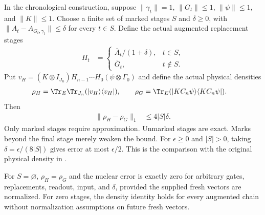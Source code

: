 \begin{theorem}
    \label{thm:construction_original_density_error}
    \leanok
    In the chronological construction, suppose
    $\lVert\gamma_t\rVert=1$, $\lVert G_t\rVert\leq1$,
    $\lVert\psi\rVert\leq1$, and $\lVert K\rVert\leq1$.
    Choose a finite set of marked stages $S$ and $\delta\geq0$, with
    $\lVert A_t-A_{G_t,\gamma_t}\rVert\leq\delta$ for every $t\in S$.
    Define the actual augmented replacement stages
    \begin{align}
        H_t & =\begin{cases}
                   \overline A_t/(1+\delta), & t\in S,    \\
                   \overline G_t,            & t\notin S.
               \end{cases}
        \label{eq:construction_marked_inventory_gates}
    \end{align}
    Put $v_H=(K\otimes I_{J_n})H_{n-1}\cdots H_0
        (\psi\otimes\Gamma_0)$ and define the actual physical densities
    \begin{align}
        \rho_H & =\Tr_E\Tr_{J_n}(|v_H\rangle\langle v_H|),
        \qquad
        \rho_G=\Tr_E(|KC_n\psi\rangle\langle KC_n\psi|).
        \label{eq:construction_original_comparison}
    \end{align}
    Then
    \begin{align}
        \lVert\rho_H-\rho_G\rVert_1 & \leq4|S|\delta.
        \label{eq:construction_original_error}
    \end{align}
    Only marked stages require approximation. Unmarked stages are exact.
    Marks beyond the final stage merely weaken the bound.
    For $\epsilon\geq0$ and $|S|>0$, taking
    $\delta=\epsilon/(8|S|)$ gives error at most $\epsilon/2$.
    This is the comparison with the original physical density in
    \cite[Equation~(5.3)]{OpenAI2026PolynomialPEPS}.

    For $S=\varnothing$, $\rho_H=\rho_G$ and the nuclear error is
    exactly zero for arbitrary gates, replacements, readout, input,
    and $\delta$, provided the supplied fresh vectors are normalized.
    For zero stages, the density identity holds for every augmented
    chain without normalization assumptions on future fresh vectors.
\end{theorem}

